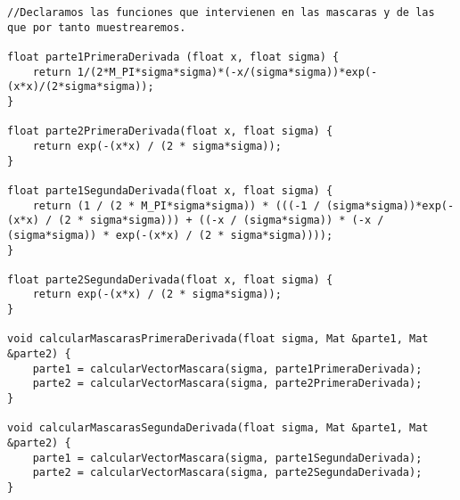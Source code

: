 \documentclass[10pt,a4paper]{article}
\begin{document}
\begin{lstlisting}
//Declaramos las funciones que intervienen en las mascaras y de las que por tanto muestrearemos.

float parte1PrimeraDerivada (float x, float sigma) {
	return 1/(2*M_PI*sigma*sigma)*(-x/(sigma*sigma))*exp(-(x*x)/(2*sigma*sigma));
}

float parte2PrimeraDerivada(float x, float sigma) {
	return exp(-(x*x) / (2 * sigma*sigma));
}

float parte1SegundaDerivada(float x, float sigma) {
	return (1 / (2 * M_PI*sigma*sigma)) * (((-1 / (sigma*sigma))*exp(-(x*x) / (2 * sigma*sigma))) + ((-x / (sigma*sigma)) * (-x / (sigma*sigma)) * exp(-(x*x) / (2 * sigma*sigma))));
}

float parte2SegundaDerivada(float x, float sigma) {
	return exp(-(x*x) / (2 * sigma*sigma));
}

void calcularMascarasPrimeraDerivada(float sigma, Mat &parte1, Mat &parte2) {
	parte1 = calcularVectorMascara(sigma, parte1PrimeraDerivada);
	parte2 = calcularVectorMascara(sigma, parte2PrimeraDerivada);
}

void calcularMascarasSegundaDerivada(float sigma, Mat &parte1, Mat &parte2) {
	parte1 = calcularVectorMascara(sigma, parte1SegundaDerivada);
	parte2 = calcularVectorMascara(sigma, parte2SegundaDerivada);
}
\end{lstlisting}
\end{document}
